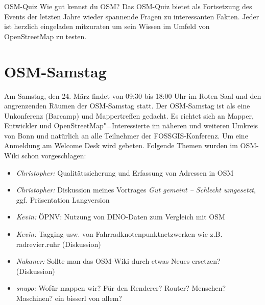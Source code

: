 %
{OSM-Quiz}%
{Wie gut kennst du OSM?}%
{Das OSM-Quiz bietet als Fortsetzung des Events der letzten Jahre wieder spannende Fragen zu
interessanten Fakten. Jeder ist herzlich eingeladen mitzuraten um sein Wissen im Umfeld von
OpenStreetMap zu testen.}


\newpage
\pagestyle{cropmarksstyle}


\newpage
\section*{OSM-Samstag}
\label{osm-samstag}
Am Samstag, den 24. März findet von 09:30 bis 18:00 Uhr im Roten Saal und den angrenzenden Räumen der OSM-Samstag statt.
Der OSM-Samstag ist als eine Unkonferenz (Barcamp) und Mappertreffen gedacht.
Es richtet sich an Mapper, Entwickler und OpenStreetMap"=Interessierte im näheren und
weiteren Umkreis von Bonn und natürlich an alle Teilnehmer der FOSSGIS-Konferenz. Um eine Anmeldung am Welcome Desk wird gebeten.
Folgende Themen wurden im OSM-Wiki schon vorgeschlagen:
\begin{itemize}
  \RaggedRight
  \setlength{\itemsep}{-1pt}
  \item \emph{Christopher:} Qualitätssicherung und Erfassung von Adressen in OSM
  \item \emph{Christopher:} Diskussion meines Vortrages \emph{Gut gemeint -- Schlecht umgesetzt}, ggf. Präsentation Langversion
  \item \emph{Kevin:} ÖPNV: Nutzung von DINO-Daten zum Vergleich mit OSM
  \item \emph{Kevin:} Tagging usw. von Fahrradknotenpunktnetzwerken wie z.B. radrevier.ruhr (Diskussion)
  \item \emph{Nakaner:} Sollte man das OSM-Wiki durch etwas Neues ersetzen? (Diskussion)
  \item \emph{snupo:} Wofür mappen wir? Für den Renderer? Router? Menschen? Maschinen? ein bisserl von allem?
\end{itemize}
\vfill
\justifying

\newpage

